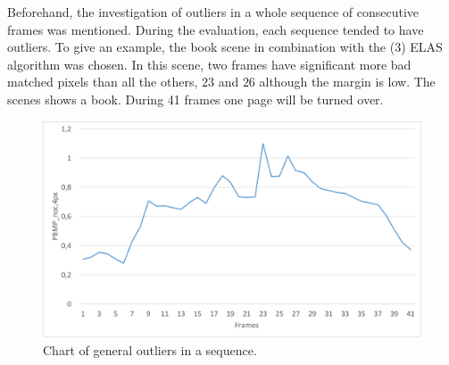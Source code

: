 Beforehand, the investigation of outliers in a whole sequence of consecutive frames was mentioned.
During the evaluation, each sequence tended to have outliers.
To give an example, the book scene in combination with the (3) ELAS algorithm was chosen.
In this scene, two frames have significant more bad matched pixels than all the others, $23$ and $26$ although the margin is low.
The scenes shows a book.
During 41 frames one page will be turned over.

\begin{figure}[h!]
\centering
\includegraphics[width=1.0\textwidth]{src/images/evaluation/plots/01-book-general-outliers.pdf}
\caption[Chart of general outliers in a sequence]{Chart of general outliers in a sequence.}
\label{fig:eval-plots-outliers}
\end{figure}

